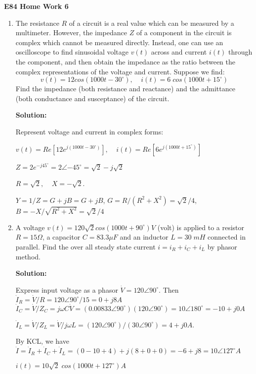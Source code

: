 \usepackage{html}

\begin{center}
{\Large \bf E84 Home Work 6}
\end{center}
\begin{enumerate}


\item The resistance $R$ of a circuit is a real value which can be measured
by a multimeter. However, the impedance $Z$ of a component in the circuit is 
complex which cannot be measured directly. Instead, one can use an oscilloscope 
to find sinusoidal voltage $v(t)$ across and current $i(t)$ through the component,
and then obtain the impedance as the ratio between the complex representations of 
the voltage and current. Suppose we find:
\[ v(t)=12 cos(1000t-30^\circ),\;\;\;\; i(t)=6\;cos(1000t+15^\circ) \]
Find the impedance (both resistance and reactance) and the admittance (both
conductance and susceptance) of the circuit.

{\bf Solution:}

Represent voltage and current in complex forms:

$v(t)=Re[12e^{j(1000 t-30^\circ)}],\;\;\;\;i(t)=Re[6e^{j(1000 t+15^\circ)}]$

 $Z=2e^{-j45^\circ}=2\angle{-45^\circ}=\sqrt{2}-j\sqrt{2}$

 $R=\sqrt{2},\;\;\;\;X=-\sqrt{2}$.

 $Y=1/Z=G+jB=G+jB$, $G=R/(R^2+X^2)=\sqrt{2}/4$, 
	$B=-X/\sqrt{R^2+X^2}=\sqrt{2}/4$

\item A voltage $v(t)=120\sqrt{2} cos(1000t+90^\circ) V$ (volt) is applied to 
a resistor $R=15\Omega$, a capacitor $C=83.3\mu F$ and an inductor $L=30\; mH$ 
connected in parallel. Find the over all steady state current $i=i_R+i_C+i_L$ 
by phasor method.

{\bf Solution:}

Express input voltage as a phasor $\dot{V}=120\angle{90^\circ}$.  
Then $\dot{I}_R=\dot{V}/R=120\angle{90^\circ}/15=0+j8 A$
 $\dot{I}_C=\dot{V}/Z_C=j\omega C\dot{V}=(0.00833\angle 90^\circ)(120\angle{90^\circ})
 	=10\angle 180^\circ=-10+j0 A$

$\dot{I}_L=\dot{V}/Z_L=\dot{V}/j\omega L=(120\angle 90^\circ)/(30\angle{90^\circ})=4+j0 A$.

By KCL, we have $\dot{I}=\dot{I}_R+\dot{I}_C+\dot{I}_L=(0-10+4)+j(8+0+0)
  	=-6+j8=10\angle{127^\circ} A$

  $i(t)=10\sqrt{2}\;cos(1000t+127^\circ) A$


\end{enumerate}
